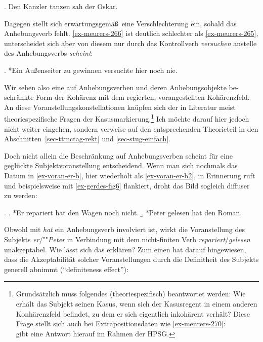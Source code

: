 \ex. Den Kanzler tanzen sah der Oskar. \hfill \citep[(275)]{Meurers:99}\label{ex-meurers-275}

Dagegen stellt sich erwartungsgemä\ss\ eine Verschlechterung ein, sobald das Anhebungsverb fehlt. \ref{ex-meurers-266} ist deutlich schlechter als \ref{ex-meurers-265}, unterscheidet sich aber von diesem nur durch das Kontrollverb {\it versuchen} anstelle des Anhebungsverbs {\it scheint}: 

\ex. *Ein Au\ss enseiter zu gewinnen versuchte hier noch nie. \hfill \citep[(266)]{Meurers:99}\label{ex-meurers-266}

Wir sehen also eine auf Anhebungsverben und deren Anhebungsobjekte be-\linebreak schränkte Form der Kohärenz mit dem regierten, vorangestellten Kohärenzfeld. An diese Voranstellungskonstellationen knüpfen sich der in Literatur meist theoriespezifische Fragen der Kasusmarkierung.\footnote{Grundsätzlich muss folgendes (theoriespezifisch) beantwortet werden: Wie erhält das Subjekt seinen Kasus, wenn sich der Kasusregent in einem anderen Konhärenzfeld befindet, zu dem er sich eigentlich inkohärent verhält? Diese Frage stellt sich auch bei Extrapositionsdaten wie \ref{ex-meurers-270}:\\
\citet[316ff]{Meurers:99} gibt eine Antwort hierauf im Rahmen der HPSG.} Ich möchte darauf hier jedoch nicht weiter eingehen, sondern verweise auf den entsprechenden Theorieteil in den Abschnitten~\ref{sec-ttmctag-rekt} und \ref{sec-stug-einfach}.

Doch nicht allein die Beschränkung auf Anhebungsverben scheint für eine geglückte Subjektvoranstellung entscheidend. Wenn man sich nochmals das Datum in \ref{ex-voran-er-b}, hier wiederholt als \ref{ex-voran-er-b2}, in Erinnerung ruft und beispielsweise mit \ref{ex-gerdes-fig6} flankiert, droht das Bild sogleich diffuser zu werden: 

\ex. 
\a. *Er repariert hat den Wagen noch nicht.\label{ex-voran-er-b2} 
\b. *Peter gelesen hat den Roman. \hfill \citep[Fig.6]{Gerdes:04}\label{ex-gerdes-fig6} 

Obwohl mit {\it hat} ein Anhebungsverb involviert ist, wirkt die Voranstellung des Subjekts {\it er}/""{\it Peter} in Verbindung mit dem nicht-finiten Verb {\it repariert}/{\it gelesen} unakzeptabel. Wie lässt sich das erklären? Zum einen hat \cite{Haider:90} darauf hingewiesen, dass die Akzeptabilität solcher Voranstellungen durch die Definitheit des Subjekts generell abnimmt ("`definiteness effect"'):   

